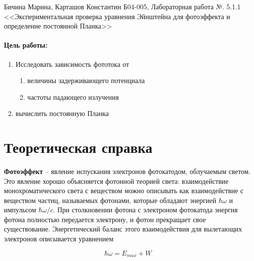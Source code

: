 \documentclass[a4paper,12pt]{article}
\author{Бичина Марина 
группа Б04-005 1 курса ФЭФМ}
\title{}
\date{}
\begin{document}

\begin{center}
\begin{Large}
{Бичина Марина, Карташов Константин Б04-005, Лабораторная работа №. 5.1.1 <<Экспериментальная проверка уравнения Эйнштейна для фотоэффекта и определение постоянной Планка>>}
\end{Large}
\end{center}
\paragraph{Цель работы:} 
\begin{enumerate}
\itemsep0em
\item Исследовать зависимость фототока от 
\begin{enumerate}
\itemsep0em
\item величины задерживающего потенциала
\item частоты падающего излучения
\end{enumerate}
\item вычислить постоянную Планка
\end{enumerate}

\section{Теоретическая справка}
\paragraph{}
\textbf{Фотоэффект} -- явление испускания электронов фотокатодом, облучаемым светом. Это явление хорошо объясняется фотонной теорией света: взаимодействие монохроматического света с веществом можно описывать как взаимодействие с веществом частиц, называемых фотонами, которые обладают энергией $ \hbar \omega $ и импульсом $ \hbar\omega/c $. При столкновении фотона с электроном фотокатода энергия фотона полностью передается электрону, и фотон прекращает свое существование. Энергетический баланс этого взаимодействия для вылетающих электронов описывается уравнением
	
\begin{equation}
\hbar \omega = E_{max} + W
\label{e:energy_balance}
\end{equation}
	
\end{document}
